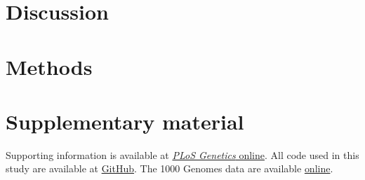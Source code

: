 \section{Discussion}

\section{Methods}

\section{Supplementary material}
Supporting information is available at \href{https://journals.plos.org/plosgenetics/article?id=10.1371/journal.pgen.1011032#sec018}{\textit{PLoS Genetics} online}. All code used in this study are available at \href{https://github.com/ziyimo/popgen-dom-adapt}{GitHub}. The 1000 Genomes data are available \href{https://www.internationalgenome.org/data}{online}.
